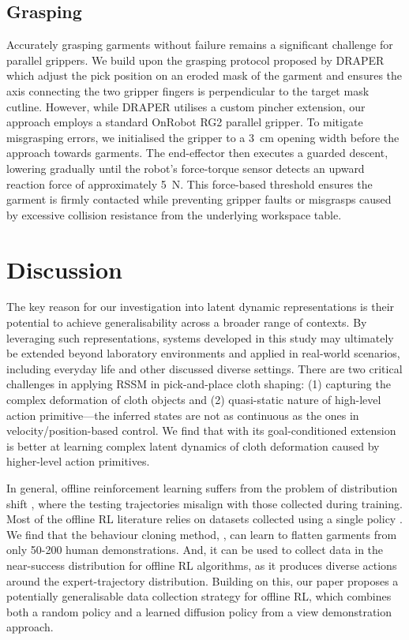 \documentclass[journal]{IEEEtran}
\newcommand{\addinfo}[1]{\textcolor{myPurple}{#1}}
\begin{document}
\subsection{Grasping} \label{sec:grasping}

\addinfo{Accurately grasping garments without failure remains a significant challenge for parallel grippers. We build upon the grasping protocol proposed by DRAPER \cite{kadi2025draper} which adjust the pick position on an eroded mask of the garment and ensures the axis connecting the two gripper fingers is perpendicular to the target mask cutline. However, while DRAPER utilises a custom pincher extension, our approach employs a standard OnRobot RG2 parallel gripper. To mitigate misgrasping errors, we initialised the gripper to a 3~cm opening width before the approach towards garments. The end-effector then executes a guarded descent, lowering gradually until the robot's force-torque sensor detects an upward reaction force of approximately 5~N. This force-based threshold ensures the garment is firmly contacted while preventing gripper faults or misgrasps caused by excessive collision resistance from the underlying workspace table.}


\section{Discussion} \label{sec:discussion}

The key reason for our investigation into latent dynamic representations is their potential to achieve generalisability across a broader range of contexts. By leveraging such representations, systems developed in this study may ultimately be extended beyond laboratory environments and applied in real-world scenarios, including everyday life and other discussed diverse settings. There are two critical challenges in applying RSSM in pick-and-place cloth shaping: (1) capturing the complex deformation of cloth objects and (2) quasi-static nature of high-level action primitive---the inferred states are not as  continuous as the ones in velocity/position-based control. We find that  \cite{hafner2019learning} with its goal-conditioned extension is better at learning complex latent dynamics of cloth deformation caused by higher-level action primitives.

In general, offline reinforcement learning suffers from the problem of distribution shift \cite{prudencio2023survey}, where the testing trajectories misalign with those collected during training. Most of the offline RL literature relies on datasets collected using a single policy \cite{agarwal2020optimistic}. We find that the behaviour cloning method,  \cite{chi2023diffusionpolicy}, can learn to flatten garments from only 50-200 human demonstrations. And, it can be used to collect data in the near-success distribution for offline RL algorithms, as it produces diverse actions around the expert-trajectory distribution. Building on this, our paper proposes a potentially generalisable data collection strategy for offline RL, which combines both a random policy and a learned diffusion policy from a view demonstration approach.
\end{document}
